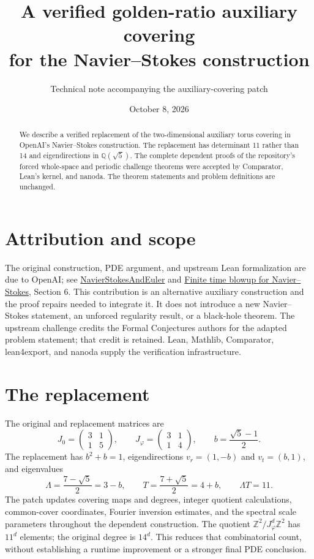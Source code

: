\documentclass[10pt]{article}
\title{A verified golden-ratio auxiliary covering\\for the Navier--Stokes construction}
\author{Technical note accompanying the auxiliary-covering patch}
\date{October 8, 2026}
\begin{document}
\maketitle
\vspace{-1.2em}
\begin{abstract}
We describe a verified replacement of the two-dimensional auxiliary torus
covering in OpenAI's Navier--Stokes construction. The replacement has
determinant 11 rather than 14 and eigendirections in $\mathbb Q(\sqrt5)$.
The complete dependent proofs of the repository's forced whole-space and
periodic challenge theorems were accepted by Comparator, Lean's kernel,
and nanoda. The theorem statements and problem definitions are unchanged.
\end{abstract}

\section*{Attribution and scope}
The original construction, PDE argument, and upstream Lean formalization
are due to OpenAI; see \href{https://github.com/openai/NavierStokesAndEuler}{NavierStokesAndEuler}
and \href{https://cdn.openai.com/pdf/32d9f210-8b73-45e0-91bc-82a30aef8a9a/navier-stokes.pdf}{Finite time blowup for Navier--Stokes}, Section 6.
This contribution is an alternative auxiliary construction and the proof
repairs needed to integrate it. It does not introduce a new Navier--Stokes
statement, an unforced regularity result, or a black-hole theorem.
The upstream challenge credits the Formal Conjectures authors for the
adapted problem statement; that credit is retained. Lean, Mathlib,
Comparator, lean4export, and nanoda supply the verification infrastructure.

\section*{The replacement}
The original and replacement matrices are
\[
 J_0=\begin{pmatrix}3&1\\1&5\end{pmatrix},\qquad
 J_\varphi=\begin{pmatrix}3&1\\1&4\end{pmatrix},\qquad
 b=\frac{\sqrt5-1}{2}.
\]
The replacement has $b^2+b=1$, eigendirections $v_r=(1,-b)$ and
$v_t=(b,1)$, and eigenvalues
\[
 \Lambda=\frac{7-\sqrt5}{2}=3-b,\qquad
 T=\frac{7+\sqrt5}{2}=4+b,\qquad \Lambda T=11.
\]
The patch updates covering maps and degrees, integer quotient calculations,
common-cover coordinates, Fourier inversion estimates, and the spectral
scale parameters throughout the dependent construction. The quotient
$\mathbb Z^2/J_\varphi^d\mathbb Z^2$ has $11^d$ elements; the original
degree is $14^d$. This reduces that combinatorial count, without establishing
a runtime improvement or a stronger final PDE conclusion.
\end{document}
